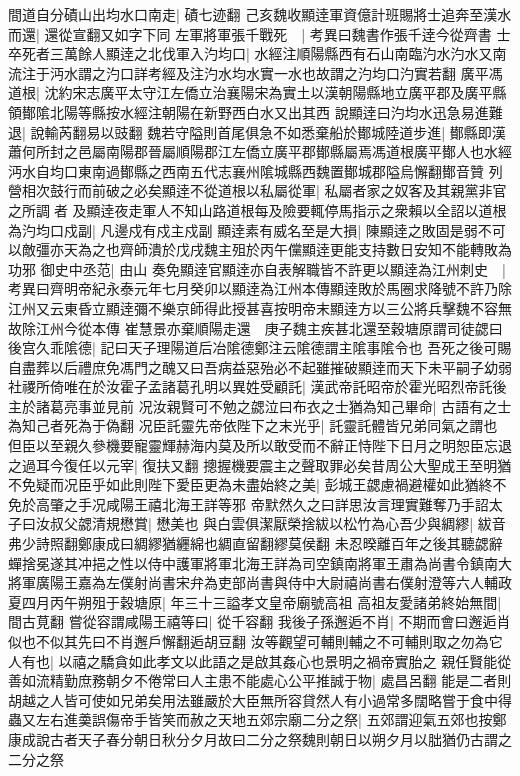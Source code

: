 間道自分磧山出均水口南走|{
	磧七迹翻}
己亥魏收顯逹軍資億計班賜將士追奔至漢水而還|{
	還從宣翻又如字下同}
左軍將軍張千戰死　|{
	考異曰魏書作張千逹今從齊書}
士卒死者三萬餘人顯逹之北伐軍入汋均口|{
	水經注順陽縣西有石山南臨汋水汋水又南流注于沔水謂之汋口詳考經及注汋水均水實一水也故謂之汋均口汋實若翻}
廣平馮道根|{
	沈約宋志廣平太守江左僑立治襄陽宋為實土以漢朝陽縣地立廣平郡及廣平縣領鄼隂北陽等縣按水經注朝陽在新野西白水又出其西}
說顯逹曰汋均水迅急易進難退|{
	說輸芮翻易以豉翻}
魏若守隘則首尾俱急不如悉棄船於鄼城陸道步進|{
	鄼縣即漢蕭何所封之邑屬南陽郡晉屬順陽郡江左僑立廣平郡鄼縣屬焉馮道根廣平鄼人也水經沔水自均口東南過鄼縣之西南五代志襄州隂城縣西魏置鄼城郡隘烏懈翻鄼音贊}
列營相次鼓行而前破之必矣顯逹不從道根以私屬從軍|{
	私屬者家之奴客及其親黨非官之所調者}
及顯逹夜走軍人不知山路道根每及險要輒停馬指示之衆賴以全詔以道根為汋均口戍副|{
	凡邊戍有戍主戍副}
顯逹素有威名至是大損|{
	陳顯逹之敗固是弱不可以敵彊亦天為之也齊師潰於戊戌魏主殂於丙午儻顯逹更能支持數日安知不能轉敗為功邪}
御史中丞范|{
	由山}
奏免顯逹官顯逹亦自表解職皆不許更以顯逹為江州刺史　|{
	考異曰齊明帝紀永泰元年七月癸卯以顯逹為江州本傳顯逹敗於馬圈求降號不許乃除江州又云東昏立顯逹彌不樂京師得此授甚喜按明帝末顯逹方以三公將兵擊魏不容無故除江州今從本傳}
崔慧景亦棄順陽走還　庚子魏主疾甚北還至穀塘原謂司徒勰曰後宫久乖隂德|{
	記曰天子理陽道后冶隂德鄭注云隂德謂主隂事隂令也}
吾死之後可賜自盡葬以后禮庶免馮門之醜又曰吾病益惡殆必不起雖摧破顯逹而天下未平嗣子幼弱社禝所倚唯在於汝霍子孟諸葛孔明以異姓受顧託|{
	漢武帝託昭帝於霍光昭烈帝託後主於諸葛亮事並見前}
况汝親賢可不勉之勰泣曰布衣之士猶為知己畢命|{
	古語有之士為知己者死為于偽翻}
况臣託靈先帝依陛下之末光乎|{
	託靈託體皆兄弟同氣之謂也}
但臣以至親久參機要寵靈輝赫海内莫及所以敢受而不辭正恃陛下日月之明恕臣忘退之過耳今復任以元宰|{
	復扶又翻}
摠握機要震主之聲取罪必矣昔周公大聖成王至明猶不免疑而况臣乎如此則陛下愛臣更為未盡始終之美|{
	彭城王勰慮禍避權如此猶終不免於高肇之手况咸陽王禧北海王詳等邪}
帝默然久之曰詳思汝言理實難奪乃手詔太子曰汝叔父勰清規懋賞|{
	懋美也}
與白雲俱潔厭榮捨紱以松竹為心吾少與綢繆|{
	紱音弗少詩照翻鄭康成曰綢繆猶纒綿也綢直留翻繆莫侯翻}
未忍暌離百年之後其聽勰辭蟬捨冕遂其冲挹之性以侍中護軍將軍北海王詳為司空鎮南將軍王肅為尚書令鎮南大將軍廣陽王嘉為左僕射尚書宋弁為吏部尚書與侍中大尉禧尚書右僕射澄等六人輔政夏四月丙午朔殂于穀塘原|{
	年三十三謚孝文皇帝廟號高祖}
高祖友愛諸弟終始無間|{
	間古莧翻}
嘗從容謂咸陽王禧等曰|{
	從千容翻}
我後子孫邂逅不肖|{
	不期而會曰邂逅肖似也不似其先曰不肖邂戶懈翻逅胡豆翻}
汝等觀望可輔則輔之不可輔則取之勿為它人有也|{
	以禧之驕貪如此孝文以此語之是啟其姦心也景明之禍帝實胎之}
親任賢能從善如流精勤庶務朝夕不倦常曰人主患不能處心公平推誠于物|{
	處昌呂翻}
能是二者則胡越之人皆可使如兄弟矣用法雖嚴於大臣無所容貸然人有小過常多闊略嘗于食中得蟲又左右進羮誤傷帝手皆笑而赦之天地五郊宗廟二分之祭|{
	五郊謂迎氣五郊也按鄭康成說古者天子春分朝日秋分夕月故曰二分之祭魏則朝日以朔夕月以朏猶仍古謂之二分之祭}
